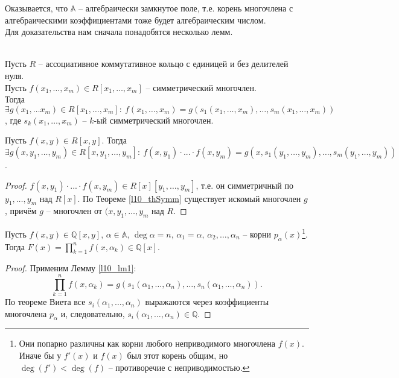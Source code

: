 Оказывается, что $\mathbb{A}$ -- алгебраически замкнутое поле, т.е. корень многочлена с алгебраическими коэффициентами тоже будет алгебраическим числом.\\
Для доказательства нам сначала понадобятся несколько лемм.

\begin{theorem} \label{l10_thSymm}~\\
	Пусть $R$ -- ассоциативное коммутативное кольцо с единицей и без делителей нуля.\\
	Пусть $f \left( x_1, \dots, x_m \right) \in R \left[ x_1, \dots, x_m \right]$ -- симметрический многочлен.\\
	Тогда $\exists g\left( x_1, \dots x_m \right) \in R \left[ x_1, \dots, x_m \right]: \ f\left( x_1, \dots, x_m \right) = g\left( s_1\left( x_1, \dots, x_m \right), \dots, s_m\left( x_1, \dots, x_m \right) \right)$, где $s_k\left( x_1, \dots, x_m \right)$ -- $k$-ый симметрический многочлен.
\end{theorem}

\begin{lemma} \label{l10_lm1}
	Пусть $f(x,y) \in R[x,y]$. Тогда 
	$\displaystyle \exists g(x, y_1, \dots, y_m) \in R[x, y_1, \dots, y_m]: \ f(x,y_1)\cdot...\cdot f(x,y_m) = g(x,s_1(y_1,\dots,y_m),\dots,s_m(y_1,\dots,y_m))$.
\end{lemma}
\begin{proof}
	$f(x,y_1) \cdot ... \cdot f(x, y_m) \in R[x][y_1,\dots,y_m]$, т.е. он симметричный по $y_1,\dots,y_m$ над $R[x]$. По Теореме \ref{l10_thSymm} существует искомый многочлен $g$, причём $g$ -- многочлен от $(x,y_1,\dots,y_m$ над $R$.
\end{proof}

\begin{lemma} \label{l10_lm2}
	Пусть $f(x,y) \in \mathbb{Q}[x,y], \, \alpha \in \mathbb{A}, \, \deg\alpha = n, \, \alpha_1 = \alpha, \, \alpha_2,\dots,\alpha_n$ -- корни $p_\alpha(x)$\footnote{Они попарно различны как корни любого неприводимого многочлена $f(x)$. Иначе бы у $f'(x)$ и $f(x)$ был этот корень общим, но $\deg(f') < \deg(f)$ -- противоречие с неприводимостью.}. Тогда $F(x) = \prod\limits_{k=1}^n f(x,\alpha_k) \in \mathbb{Q}[x]$.
\end{lemma}
\begin{proof}
	Применим Лемму \ref{l10_lm1}:
	$$\prod\limits_{k=1}^n f(x, \alpha_k) = g\left( s_1\left( \alpha_1, \dots, \alpha_n \right), \dots, s_n\left( \alpha_1, \dots, \alpha_n \right) \right).$$
	По теореме Виета все $s_i(\alpha_1,\dots,\alpha_n)$ выражаются через коэффициенты многочлена $p_\alpha$ и, следовательно, $s_i(\alpha_1,\dots,\alpha_n) \in \mathbb{Q}$.
\end{proof}

